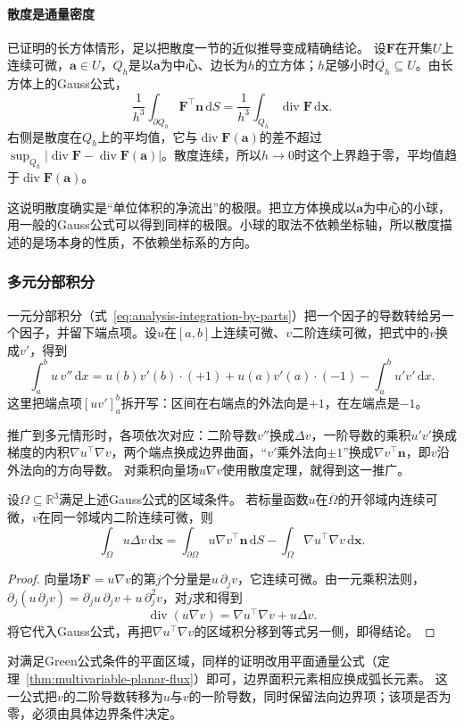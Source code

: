 \paragraph{散度是通量密度}

已证明的长方体情形，足以把散度一节的近似推导变成精确结论。
设$\bm F$在开集$U$上连续可微，$\bm a\in U$，$Q_h$是以$\bm a$为中心、边长为$h$的立方体；$h$足够小时$\overline{Q_h}\subseteq U$。由长方体上的Gauss公式，
\[
 \frac1{h^3}\int_{\partial Q_h}\bm F^\top\bm n\,\mathrm dS
 =\frac1{h^3}\int_{Q_h}\operatorname{div}\bm F\,\mathrm d\bm x.
\]
右侧是散度在$Q_h$上的平均值，它与$\operatorname{div}\bm F(\bm a)$的差不超过$\sup_{Q_h}|\operatorname{div}\bm F-\operatorname{div}\bm F(\bm a)|$。散度连续，所以$h\to0$时这个上界趋于零，平均值趋于$\operatorname{div}\bm F(\bm a)$。

这说明散度确实是“单位体积的净流出”的极限。把立方体换成以$\bm a$为中心的小球，用一般的Gauss公式可以得到同样的极限。小球的取法不依赖坐标轴，所以散度描述的是场本身的性质，不依赖坐标系的方向。

\subsubsection{多元分部积分}

一元分部积分（式~\eqref{eq:analysis-integration-by-parts}）把一个因子的导数转给另一个因子，并留下端点项。设$u$在$[a,b]$上连续可微、$v$二阶连续可微，把式中的$v$换成$v'$，得到
\[
 \int_a^bu\,v''\,\mathrm dx
 =u(b)v'(b)\cdot(+1)+u(a)v'(a)\cdot(-1)-\int_a^bu'v'\,\mathrm dx.
\]
这里把端点项$[uv']_a^b$拆开写：区间在右端点的外法向是$+1$，在左端点是$-1$。

推广到多元情形时，各项依次对应：二阶导数$v''$换成$\Delta v$，一阶导数的乘积$u'v'$换成梯度的内积$\nabla u^\top\nabla v$，两个端点换成边界曲面，“$v'$乘外法向$\pm1$”换成$\nabla v^\top\bm n$，即$v$沿外法向的方向导数。
对乘积向量场$u\nabla v$使用散度定理，就得到这一推广。
\begin{theorem}[多元分部积分]
\label{thm:multivariable-integration-by-parts}
设$\Omega\subseteq\mathbb R^3$满足上述Gauss公式的区域条件。
若标量函数$u$在$\overline\Omega$的开邻域内连续可微，$v$在同一邻域内二阶连续可微，则
\[
 \int_\Omega u\Delta v\,\mathrm d\bm x
 =\int_{\partial\Omega}u\nabla v^\top\bm n\,\mathrm dS
  -\int_\Omega\nabla u^\top\nabla v\,\mathrm d\bm x.
\]
\end{theorem}
\begin{proof}
向量场$\bm F=u\nabla v$的第$j$个分量是$u\,\partial_jv$，它连续可微。由一元乘积法则，
$\partial_j(u\,\partial_jv)=\partial_ju\,\partial_jv+u\,\partial_j^2v$，对$j$求和得到
\[
 \operatorname{div}(u\nabla v)
 =\nabla u^\top\nabla v+u\Delta v.
\]
将它代入Gauss公式，再把$\nabla u^\top\nabla v$的区域积分移到等式另一侧，即得结论。
\end{proof}
对满足Green公式条件的平面区域，同样的证明改用平面通量公式（定理~\ref{thm:multivariable-planar-flux}）即可，边界面积元素相应换成弧长元素。
这一公式把$v$的二阶导数转移为$u$与$v$的一阶导数，同时保留法向边界项；该项是否为零，必须由具体边界条件决定。

